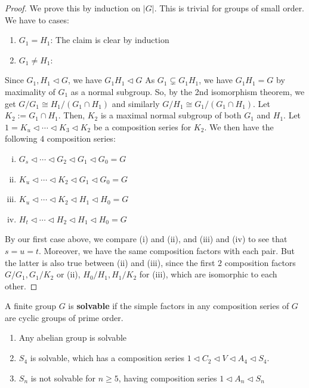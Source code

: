 \begin{proof}
    We prove this by induction on $|G|$. This is trivial for groups of small order. We have to cases:
    \begin{enumerate}
        \item $G_1 =H_1$: The claim is clear by induction
        \item $G_1 \neq H_1$:
    \end{enumerate}
    Since $G_1,H_1 \lhd G$, we have $G_1H_1 \lhd G$ As $G_1  \subsetneq G_1H_1$, we have $G_1H_1 =G$ by maximality of $G_1$ as a normal subgroup. So, by the 2nd isomorphism theorem, we get $G/G_1 \cong H_1/(G_1 \cap H_1)$ and similarly $G/H_1 \cong G_1 /(G_1 \cap H_1)$. Let $K_2 := G_1 \cap H_1$. Then, $K_2$ is a maximal normal subgroup of both $G_1$ and $H_1$. Let $1=K_u \lhd \cdots \lhd K_3 \lhd K_2$ be a composition series for $K_2$. We then have the following $4$ composition series:
    \begin{enumerate}[(i)]
        \item $G_s \lhd \cdots \lhd G_2 \lhd G_1 \lhd G_0=G$
        \item $K_u \lhd \cdots \lhd K_2 \lhd G_1 \lhd G_0 = G$
        \item $K_u \lhd \cdots \lhd K_2 \lhd H_1 \lhd H_0 =G$
        \item $H_t \lhd \cdots \lhd H_2 \lhd H_1 \lhd H_0 = G$
    \end{enumerate}
    By our first case above, we compare (i) and (ii), and (iii) and (iv) to see that $s=u=t$. Moreover, we have the same composition factors with each pair. But the latter is also true between (ii) and (iii), since the first $2$ composition factors $G/G_1,G_1/K_2$ or (ii), $H_0/H_1,H_1/K_2$ for (iii), which are isomorphic to each other.
\end{proof}

\begin{defn}
    A finite group $G$ is \textbf{solvable} if the simple factors in any composition series of $G$ are cyclic groups of prime order.
\end{defn}

\begin{ex}
    \begin{enumerate}
        \item Any abelian group is solvable
        \item $S_4$ is solvable, which has a composition series $1 \lhd C_2 \lhd V \lhd A_4 \lhd S_4$.
        \item $S_n$ is not solvable for $n \geq 5$, having composition series $1 \lhd A_n \lhd S_n$
    \end{enumerate}
\end{ex}

